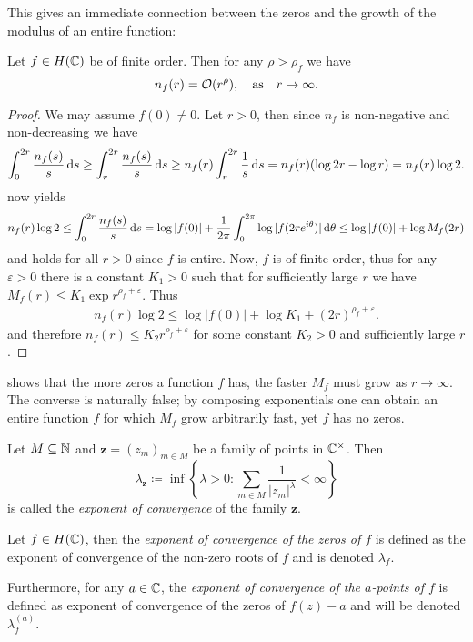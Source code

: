 This gives an immediate connection between the zeros and the growth of the modulus of an entire function:

\begin{proposition} \label{prop:zeros-bounded-by-order}
    Let $f \in H(\mathbb{C})$ be of finite order. Then for any $\rho > \rho_f$ we have
    $$ n_f(r) = \mathcal{O}(r^{\rho}), \quad \textrm{as} \quad r \to \infty. $$
\end{proposition}

\begin{proof}
    We may assume $f(0) \neq 0$. Let $r > 0$, then since $n_f$ is non-negative and non-decreasing we have
    \begin{align*}
        \int_0^{2r} \frac{n_f(s)}{s} \mathop{}\!\mathrm{d} s \geq \int_r^{2r} \frac{n_f(s)}{s} \mathop{}\!\mathrm{d} s \geq n_f(r) \int_r^{2r} \frac{1}{s} \mathop{}\!\mathrm{d} s = n_f(r) (\log 2r - \log r) = n_f(r) \log 2.
    \end{align*}
     now yields
    \begin{equation*}
        n_f(r) \log 2 \leq \int_0^{2r} \frac{n_f(s)}{s} \mathop{}\!\mathrm{d} s = \log \vert f(0) \vert + \frac{1}{2\pi} \int_0^{2 \pi} \log \vert f(2r e^{i \theta}) \vert \mathop{}\!\mathrm{d} \theta \leq \log \vert f(0) \vert + \log M_f(2r)
    \end{equation*}
    and holds for all $r > 0$ since $f$ is entire. Now, $f$ is of finite order, thus for any $\varepsilon > 0$ there is a constant $K_1 > 0$ such that for sufficiently large $r$ we have $M_f(r) \leq K_1 \exp {r^{\rho_f + \varepsilon}}$. Thus
    \begin{align*}
        n_f(r) \log 2 \leq \log \vert f(0) \vert + \log K_1 + (2r)^{\rho_f + \varepsilon}.
    \end{align*}
    and therefore $n_f(r) \leq K_2 r^{\rho_f + \varepsilon}$ for some constant $K_2 > 0$ and sufficiently large $r$.
\end{proof}

 shows that the more zeros a function $f$ has, the faster $M_f$ must grow as $r \to \infty$. The converse is naturally false; by composing exponentials one can obtain an entire function $f$ for which $M_f$ grow arbitrarily fast, yet $f$ has no zeros.

\begin{definition} \label{def:zero-exponent}
    Let $M \subseteq \mathbb{N}$ and $\mathbf{z} = (z_m)_{m \in M}$ be a family of points in $\mathbb{C}^\times$. Then
    $$ \lambda_{\mathbf{z}} \coloneqq \inf \left\{ \lambda > 0 : \sum_{m \in M} \frac{1}{\vert z_m \vert^\lambda} < \infty \right\} $$
    is called the \emph{exponent of convergence} of the family $\mathbf{z}$.

    Let $f \in H(\mathbb{C})$, then the \emph{exponent of convergence of the zeros of $f$} is defined as the exponent of convergence of the non-zero roots of $f$ and is denoted $\lambda_f$.

    Furthermore, for any $a \in \mathbb{C}$, the \emph{exponent of convergence of the $a$-points of $f$} is defined as exponent of convergence of the zeros of $f(z) - a$ and will be denoted $\lambda_f^{(a)}$.
\end{definition}

